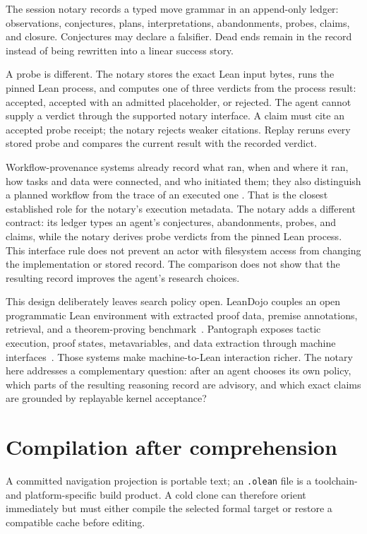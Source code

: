 \documentclass[11pt]{article}
\begin{document}
The session notary records a typed move grammar in an append-only ledger:
observations, conjectures, plans, interpretations, abandonments, probes,
claims, and closure. Conjectures may declare a falsifier. Dead ends remain in
the record instead of being rewritten into a linear success story.

A probe is different. The notary stores the exact Lean input bytes, runs the
pinned Lean process, and computes one of three verdicts from the process
result: accepted, accepted with an admitted placeholder, or rejected. The
agent cannot supply a verdict through the supported notary interface. A claim
must cite an accepted probe receipt; the notary rejects weaker citations.
Replay reruns every stored
probe and compares the current result with the recorded verdict.

Workflow-provenance systems already record what ran, when and where it ran,
how tasks and data were connected, and who initiated them; they also
distinguish a planned workflow from the trace of an executed one
\cite{workflowprovenance}. That is the closest established role for the
notary's execution metadata. The notary adds a different contract: its ledger
types an agent's conjectures, abandonments, probes, and claims, while the
notary derives probe verdicts from the pinned Lean process. This interface
rule does not prevent an actor with filesystem access from changing the
implementation or stored record. The comparison does not show that the
resulting record improves the agent's research choices.

This design deliberately leaves search policy open. LeanDojo couples an open
programmatic Lean environment with extracted proof data, premise annotations,
retrieval, and a theorem-proving benchmark~\cite{leandojo}. Pantograph exposes
tactic execution, proof states, metavariables, and data extraction through
machine interfaces~\cite{pantograph}. Those systems make machine-to-Lean
interaction richer. The notary here addresses a complementary question: after
an agent chooses its own policy, which parts of the resulting reasoning record
are advisory, and which exact claims are grounded by replayable kernel
acceptance?

\section{Compilation after comprehension}\label{sec:incremental}

A committed navigation projection is portable text; an \texttt{.olean} file is
a toolchain- and platform-specific build product. A cold clone can therefore
orient immediately but must either compile the selected formal target or
restore a compatible cache before editing.
\end{document}
